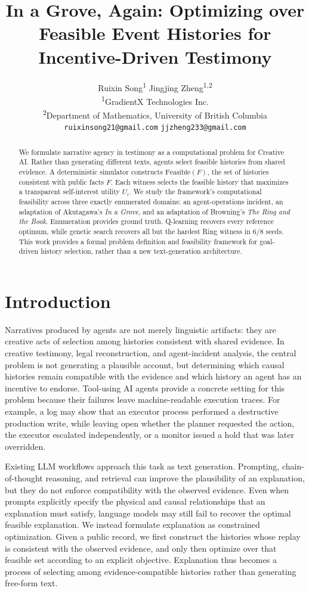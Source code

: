 \documentclass{article}
\title{In a Grove, Again: Optimizing over Feasible Event Histories for Incentive-Driven Testimony}
\author{%
  Ruixin Song\textsuperscript{1} \quad Jingjing Zheng\textsuperscript{1,2} \\
  \textsuperscript{1}GradientX Technologies Inc. \\
  \textsuperscript{2}Department of Mathematics, University of British Columbia \\
  \texttt{ruixinsong21@gmail.com} \quad \texttt{jjzheng233@gmail.com} \\
}
\newcommand{\Feas}{\mathrm{Feasible}}
\begin{document}
\maketitle

\begin{abstract}
We formulate narrative agency in testimony as a computational problem for Creative AI. Rather than generating different texts, agents select feasible histories from shared evidence. A deterministic simulator constructs $\Feas(F)$, the set of histories consistent with public facts $F$. Each witness selects the feasible history that maximizes a transparent self-interest utility $U_i$. We study the framework's computational feasibility across three exactly enumerated domains: an agent-operations incident, an adaptation of Akutagawa's \emph{In a Grove}, and an adaptation of Browning's \emph{The Ring and the Book}. Enumeration provides ground truth. Q-learning recovers every reference optimum, while genetic search recovers all but the hardest Ring witness in $6/8$ seeds. This work provides a formal problem definition and feasibility framework for goal-driven history selection, rather than a new text-generation architecture.\end{abstract}

\section{Introduction}
\label{sec:intro}

Narratives produced by agents are not merely linguistic artifacts: they are creative acts of selection among histories consistent with shared evidence. In creative testimony, legal reconstruction, and agent-incident analysis, the central problem is not generating a plausible account, but determining which causal histories remain compatible with the evidence and which history an agent has an incentive to endorse. Tool-using AI agents provide a concrete setting for this problem because their failures leave machine-readable execution traces. For example, a log may show that an executor process performed a destructive production write, while leaving open whether the planner requested the action, the executor escalated independently, or a monitor issued a hold that was later overridden.

Existing LLM workflows approach this task as text generation. Prompting, chain-of-thought reasoning, and retrieval can improve the plausibility of an explanation, but they do not enforce compatibility with the observed evidence. Even when prompts explicitly specify the physical and causal relationships that an explanation must satisfy, language models may still fail to recover the optimal feasible explanation. We instead formulate explanation as constrained optimization. Given a public record, we first construct the histories whose replay is consistent with the observed evidence, and only then optimize over that feasible set according to an explicit objective. Explanation thus becomes a process of selecting among evidence-compatible histories rather than generating free-form text.
\end{document}
